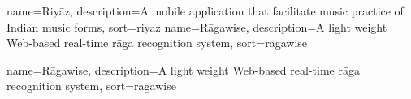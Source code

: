 {
	name={Riy\={a}z},
	description={A mobile application that facilitate music practice of Indian music forms},
	sort=riyaz
}
{
	name={R\={a}gawise},
	description={A light weight Web-based real-time r\={a}ga recognition system},
	sort=ragawise
}		


{
	name={R\={a}gawise},
	description={A light weight Web-based real-time r\={a}ga recognition system},
	sort=ragawise
}		





